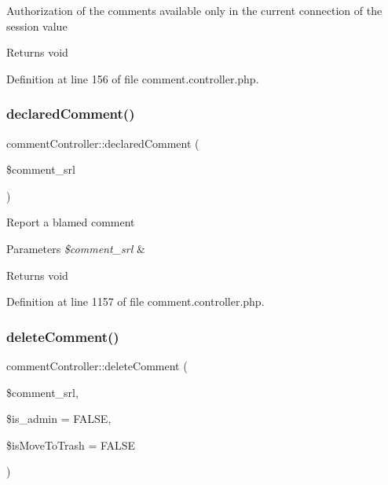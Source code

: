 Authorization of the comments available only in the current connection of the session value \begin{DoxyReturn}{Returns}
void 
\end{DoxyReturn}


Definition at line 156 of file comment.\+controller.\+php.

\mbox{\label{classcommentController_aaae1e5860a1e170a8fc3142f80bbcde6}} 
\subsubsection{\texorpdfstring{declared\+Comment()}{declaredComment()}}
{\footnotesize\ttfamily comment\+Controller\+::declared\+Comment (\begin{DoxyParamCaption}\item[{}]{\$comment\+\_\+srl }\end{DoxyParamCaption})}

Report a blamed comment 
\begin{DoxyParams}{Parameters}
{\em \$comment\+\_\+srl} & \\
\hline
\end{DoxyParams}
\begin{DoxyReturn}{Returns}
void 
\end{DoxyReturn}


Definition at line 1157 of file comment.\+controller.\+php.

\mbox{\label{classcommentController_adfd7bfdb249d109119f85e72aca2253c}} 
\subsubsection{\texorpdfstring{delete\+Comment()}{deleteComment()}}
{\footnotesize\ttfamily comment\+Controller\+::delete\+Comment (\begin{DoxyParamCaption}\item[{}]{\$comment\+\_\+srl,  }\item[{}]{\$is\+\_\+admin = {\ttfamily FALSE},  }\item[{}]{\$is\+Move\+To\+Trash = {\ttfamily FALSE} }\end{DoxyParamCaption})}

